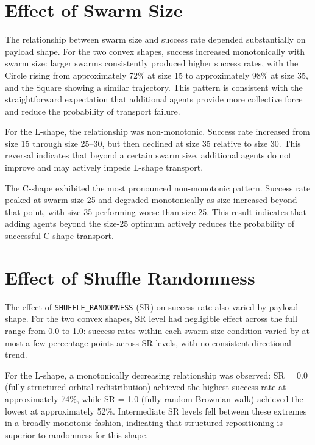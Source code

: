 \section{Effect of Swarm Size}
\label{sec:results_swarmsize}

The relationship between swarm size and success rate depended substantially on payload shape. For the two convex shapes, success increased monotonically with swarm size: larger swarms consistently produced higher success rates, with the Circle rising from approximately 72\% at size 15 to approximately 98\% at size 35, and the Square showing a similar trajectory. This pattern is consistent with the straightforward expectation that additional agents provide more collective force and reduce the probability of transport failure.

For the L-shape, the relationship was non-monotonic. Success rate increased from size 15 through size 25--30, but then declined at size 35 relative to size 30. This reversal indicates that beyond a certain swarm size, additional agents do not improve and may actively impede L-shape transport.

The C-shape exhibited the most pronounced non-monotonic pattern. Success rate peaked at swarm size 25 and degraded monotonically as size increased beyond that point, with size 35 performing worse than size 25. This result indicates that adding agents beyond the size-25 optimum actively reduces the probability of successful C-shape transport.

\section{Effect of Shuffle Randomness}
\label{sec:results_sr}

The effect of \texttt{SHUFFLE\_RANDOMNESS} (SR) on success rate also varied by payload shape. For the two convex shapes, SR level had negligible effect across the full range from 0.0 to 1.0: success rates within each swarm-size condition varied by at most a few percentage points across SR levels, with no consistent directional trend.

For the L-shape, a monotonically decreasing relationship was observed: SR = 0.0 (fully structured orbital redistribution) achieved the highest success rate at approximately 74\%, while SR = 1.0 (fully random Brownian walk) achieved the lowest at approximately 52\%. Intermediate SR levels fell between these extremes in a broadly monotonic fashion, indicating that structured repositioning is superior to randomness for this shape.

